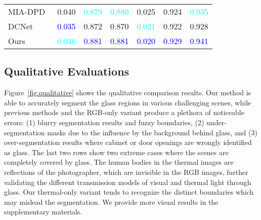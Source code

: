 \begin{table}[t]
\begin{tabular}{lcccccc}
MIA-DPD~\cite{liang2022multi}                 & 0.040            & \textcolor{cyan}{0.879}         & \textcolor{cyan}{0.880}             & 0.025            & 0.924         & \textcolor{cyan}{0.935}               \\ 

DCNet~\cite{tu2022weakly}                   & \textcolor{blue}{0.035}            & 0.872         & 0.870             & \textcolor{cyan}{0.021}            & 0.922         & 0.928               \\ 
\hline
Ours                    & \textcolor{cyan}{0.036}            & \textcolor{blue}{0.881}         & \textcolor{blue}{0.881}             & \textcolor{blue}{0.020}            & \textcolor{blue}{0.929}         & \textcolor{blue}{0.941}               \\
\bottomrule
\end{tabular}
\end{table}

\subsection{Qualitative Evaluations}
Figure~\ref{fig:qualitative} shows the qualitative comparison results. Our method is able to accurately segment the glass regions in various challenging scenes, while previous methods and the RGB-only variant produce a plethora of noticeable errors: (1) blurry segmentation results and fuzzy boundaries, (2) under-segmentation masks due to the influence by the background behind glass, and (3) over-segmentation results where cabinet or door openings are wrongly identified as glass.
The last two rows show two extreme cases where the scenes are completely covered by glass. 
The human bodies in the thermal images are reflections of the photographer, which are invisible in the RGB images, further validating the different transmission models of visual and thermal light through glass. Our thermal-only variant tends to recognize the distinct boundaries which may mislead the segmentation. We provide more visual results in the supplementary materials.




